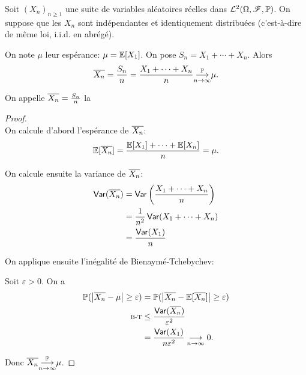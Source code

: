 \begin{proposition}
    Soit \({(X_n)}_{n\geq 1}\) une suite de variables aléatoires
    réelles dans \(\mathcal L^2(\Omega, \mathscr{F}, \mathbb{P})\). On
    suppose que les \(X_n\) sont indépendantes et identiquement
    distribuées (c'est-à-dire de même loi, i.i.d. en abrégé).

    On note \(\mu\) leur espérance: \(\mu = \mathbb{E}[X_1]\). On
    pose \(S_n = X_1 + \cdots + X_n\). Alors
    \begin{equation*}
        \overline{X_n} = \frac{S_n}{n} = \frac{X_1 + \cdots + X_n}{n} \underset{n\to\infty}{{\overset{\mathbb{P}}{\longrightarrow}}} \mu.
    \end{equation*}

    On appelle \(\overline{X_n} = \frac{S_n}{n}\) la 
\end{proposition}

\begin{proof}\,\\
    \ptr{} On calcule d'abord l'espérance de \(\overline{X_n}\):
    \begin{equation*}
        \mathbb{E}[\overline{X_n}] = \frac{\mathbb{E}[X_1] + \cdots + \mathbb{E}[X_n]}{n} = \mu.
    \end{equation*}

    \ptr{} On calcule ensuite la variance de \(\overline{X_n}\):
    \begin{equation*}
        \begin{aligned}
            \operatorname{\mathsf{Var}}(\overline{X_n})
            &= \operatorname{\mathsf{Var}}\left(\frac{X_1 + \cdots + X_n}{n}\right)\\
            &= \frac{1}{n^2} \operatorname{\mathsf{Var}}(X_1 + \cdots + X_n)\\
            &= \frac{\operatorname{\mathsf{Var}}(X_1)}{n}\\
        \end{aligned}
    \end{equation*}

    \ptr{} On applique ensuite l'inégalité de Bienaymé-Tchebychev:

    Soit \(\varepsilon > 0\). On a
    \begin{equation*}
        \begin{aligned}
            \mathbb{P}(\mathopen{}\left|\overline{X_n} - \mu\right|\mathclose{} \geq \varepsilon)
            &= \mathbb{P}(\mathopen{}\left|\overline{X_n} - \mathbb{E}[\overline{X_n}]\right|\mathclose{} \geq \varepsilon)\\
            \text{\scriptsize{B-T}}&\leq \frac{\operatorname{\mathsf{Var}}(\overline{X_n})}{\varepsilon^2}\\
            &= \frac{\operatorname{\mathsf{Var}}(X_1)}{n\varepsilon^2} \underset{n\to\infty}{\longrightarrow} 0.
        \end{aligned}
    \end{equation*}

    Donc \(\overline{X_n} \underset{n\to\infty}{{\overset{\mathbb{P}}{\longrightarrow}}} \mu\).
\end{proof}

